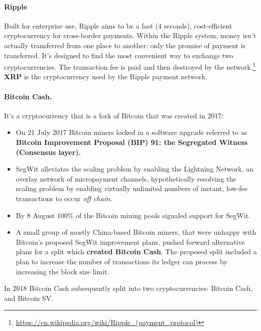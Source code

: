 \paragraph{Ripple} Built for enterprise use, Ripple aims to be a fast (4 seconds), cost-efficient cryptocurrency for cross-border payments. Within the Ripple system, money isn't actually transferred from one place to another: only the promise of payment is transferred.
It's designed to find the most convenient way to exchange two cryptocurrencies. The transaction fee is paid and then destroyed by the network.\footnote{\url{https://en.wikipedia.org/wiki/Ripple_(payment_protocol)}}
\textbf{XRP} is the cryptocurrency used by the Ripple payment network.




\paragraph{Bitcoin Cash.}

It's a cryptocurrency that is a fork of Bitcoin that was created in 2017:
\begin{itemize}
	\item On 21 July 2017 Bitcoin miners locked in a software upgrade referred to as \textbf{Bitcoin Improvement Proposal (BIP) 91: the Segregated Witness (Consensus layer).}
	\item SegWit alleviates the scaling problem by enabling the Lightning Network, an overlay network of micropayment channels, hypothetically resolving the scaling problem by enabling virtually unlimited numbers of instant, low-fee transactions to occur \textit{off chain}.
	\item By 8 August 100\% of the Bitcoin mining pools signaled support for SegWit.
	\item A small group of mostly China-based Bitcoin miners, that were unhappy with Bitcoin's proposed SegWit improvement plans, pushed forward alternative plans for a split which \textbf{created Bitcoin Cash}. The proposed split included a plan to increase the number of transactions its ledger can process by increasing the block size limit.
\end{itemize}

In 2018 Bitcoin Cash subsequently split into two cryptocurrencies: Bitcoin Cash, and Bitcoin SV.

